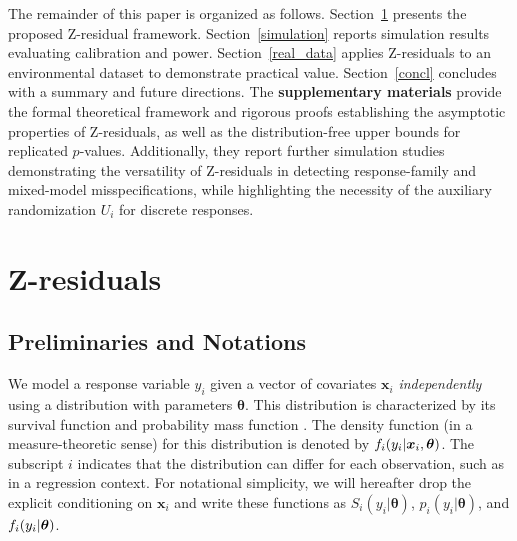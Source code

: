 The remainder of this paper is organized as follows. Section~\ref{ZRESID} presents the proposed Z-residual framework. Section~\ref{simulation} reports simulation results evaluating calibration and power. Section~\ref{real_data} applies Z-residuals to an environmental dataset to demonstrate practical value. Section~\ref{concl} concludes with a summary and future directions. The \textbf{supplementary materials} provide the formal theoretical framework and rigorous proofs establishing the asymptotic properties of Z-residuals, as well as the distribution-free upper bounds for replicated $p$-values. Additionally, they report further simulation studies demonstrating the versatility of Z-residuals in detecting response-family and mixed-model misspecifications, while highlighting the necessity of the auxiliary randomization $U_i$ for discrete responses.

\section{Z-residuals}\label{ZRESID}


\subsection{Preliminaries and Notations}

We model a response variable $y_i$ given a vector of covariates $\bm{x}_i$ \textit{independently} using a distribution with parameters $\bm{\theta}$. This distribution is characterized by its survival function  and probability mass function . The density function (in a measure-theoretic sense) for this distribution is denoted by $f_i(y_i|\bm{x}_i, \bm{\theta})$. The subscript $i$ indicates that the distribution can differ for each observation, such as in a regression context. For notational simplicity, we will hereafter drop the explicit conditioning on $\bm{x}_i$ and write these functions as $S_i(y_i|\bm{\theta})$, $p_i(y_i|\bm{\theta})$, and $f_i(y_i|\bm{\theta})$.  

